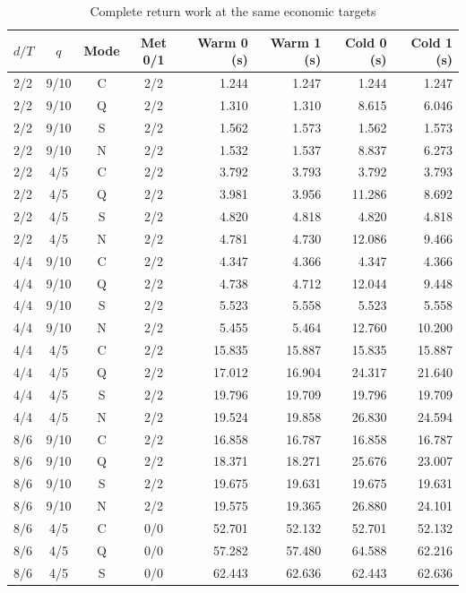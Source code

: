 \begin{table}[htbp]
\centering
\caption{Complete return work at the same economic targets}\label{tab:services61}
{\small\setlength{\tabcolsep}{3pt}
\begin{tabular}{lcccrrrr}
\hline
$d/T$ & $q$ & Mode & Met 0/1 & Warm 0 (s) & Warm 1 (s) & Cold 0 (s) & Cold 1 (s) \\
\hline
2/2 & 9/10 & C & 2/2 & 1.244 & 1.247 & 1.244 & 1.247 \\
2/2 & 9/10 & Q & 2/2 & 1.310 & 1.310 & 8.615 & 6.046 \\
2/2 & 9/10 & S & 2/2 & 1.562 & 1.573 & 1.562 & 1.573 \\
2/2 & 9/10 & N & 2/2 & 1.532 & 1.537 & 8.837 & 6.273 \\
2/2 & 4/5 & C & 2/2 & 3.792 & 3.793 & 3.792 & 3.793 \\
2/2 & 4/5 & Q & 2/2 & 3.981 & 3.956 & 11.286 & 8.692 \\
2/2 & 4/5 & S & 2/2 & 4.820 & 4.818 & 4.820 & 4.818 \\
2/2 & 4/5 & N & 2/2 & 4.781 & 4.730 & 12.086 & 9.466 \\
4/4 & 9/10 & C & 2/2 & 4.347 & 4.366 & 4.347 & 4.366 \\
4/4 & 9/10 & Q & 2/2 & 4.738 & 4.712 & 12.044 & 9.448 \\
4/4 & 9/10 & S & 2/2 & 5.523 & 5.558 & 5.523 & 5.558 \\
4/4 & 9/10 & N & 2/2 & 5.455 & 5.464 & 12.760 & 10.200 \\
4/4 & 4/5 & C & 2/2 & 15.835 & 15.887 & 15.835 & 15.887 \\
4/4 & 4/5 & Q & 2/2 & 17.012 & 16.904 & 24.317 & 21.640 \\
4/4 & 4/5 & S & 2/2 & 19.796 & 19.709 & 19.796 & 19.709 \\
4/4 & 4/5 & N & 2/2 & 19.524 & 19.858 & 26.830 & 24.594 \\
8/6 & 9/10 & C & 2/2 & 16.858 & 16.787 & 16.858 & 16.787 \\
8/6 & 9/10 & Q & 2/2 & 18.371 & 18.271 & 25.676 & 23.007 \\
8/6 & 9/10 & S & 2/2 & 19.675 & 19.631 & 19.675 & 19.631 \\
8/6 & 9/10 & N & 2/2 & 19.575 & 19.365 & 26.880 & 24.101 \\
8/6 & 4/5 & C & 0/0 & 52.701 & 52.132 & 52.701 & 52.132 \\
8/6 & 4/5 & Q & 0/0 & 57.282 & 57.480 & 64.588 & 62.216 \\
8/6 & 4/5 & S & 0/0 & 62.443 & 62.636 & 62.443 & 62.636 \\

\end{tabular}}
\end{table}
